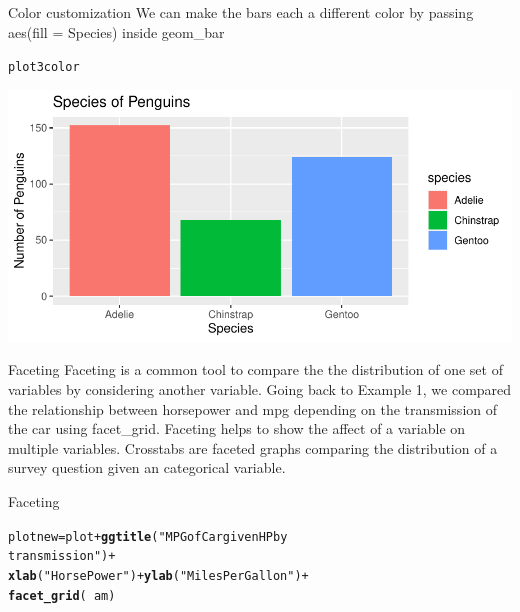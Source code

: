 \documentclass{beamer}\usepackage[]{graphicx}\usepackage[]{xcolor}
\makeatletter
\newcommand{\hlstr}[1]{\textcolor[rgb]{0.192,0.494,0.8}{#1}}%
\newcommand{\hlopt}[1]{\textcolor[rgb]{0,0,0}{#1}}%
\newcommand{\hlstd}[1]{\textcolor[rgb]{0.345,0.345,0.345}{#1}}%
\newcommand{\hlkwb}[1]{\textcolor[rgb]{0.69,0.353,0.396}{#1}}%
\newcommand{\hlkwd}[1]{\textcolor[rgb]{0.737,0.353,0.396}{\textbf{#1}}}%
\newenvironment{kframe}{%
 \def\at@end@of@kframe{}%
 \ifinner\ifhmode%
  \def\at@end@of@kframe{\end{minipage}}%
  \begin{minipage}{\columnwidth}%
 \fi\fi%
 \def\FrameCommand##1{\hskip\@totalleftmargin \hskip-\fboxsep
 \colorbox{shadecolor}{##1}\hskip-\fboxsep
     \hskip-\linewidth \hskip-\@totalleftmargin \hskip\columnwidth}%
 \MakeFramed {\advance\hsize-\width
   \@totalleftmargin\z@ \linewidth\hsize
   \@setminipage}}%
 {\par\unskip\endMakeFramed%
 \at@end@of@kframe}
\newenvironment{knitrout}{}{} %
\makeatother
\begin{document}
\begin{frame}[fragile]{Color customization}
We can make the bars each a different color by passing aes(fill = Species) inside geom\_bar
\begin{knitrout}
\color{fgcolor}\begin{kframe}
\begin{alltt}
\hlstd{plot3color}
\end{alltt}
\end{kframe}
\includegraphics[width=0.95\linewidth]{figure/unnamed-chunk-17-1} 
\end{knitrout}
\end{frame}

\begin{frame}[fragile]{Faceting}
Faceting is a common tool to compare the the distribution of one set of variables by considering another variable. Going back to Example 1, we compared the relationship between horsepower and mpg depending on the transmission of the car using facet\_grid. Faceting helps to show the affect of a variable on multiple variables.  Crosstabs are faceted graphs comparing the distribution of a survey question given an categorical variable.
\end{frame}

\begin{frame}[fragile]{Faceting}

\begin{knitrout}
\color{fgcolor}\begin{kframe}
\begin{alltt}
\hlstd{plotnew} \hlkwb{=} \hlstd{plot} \hlopt{+} \hlkwd{ggtitle}\hlstd{(}\hlstr{"MPG of Car given HP by
                         transmission"}\hlstd{)} \hlopt{+}
    \hlkwd{xlab}\hlstd{(}\hlstr{"Horse Power"}\hlstd{)} \hlopt{+} \hlkwd{ylab}\hlstd{(}\hlstr{"Miles Per Gallon"}\hlstd{)} \hlopt{+}
    \hlkwd{facet_grid}\hlstd{(}\hlopt{~}\hlstd{am)}
\end{alltt}
\end{kframe}
\end{knitrout}
\end{frame}
\end{document}
